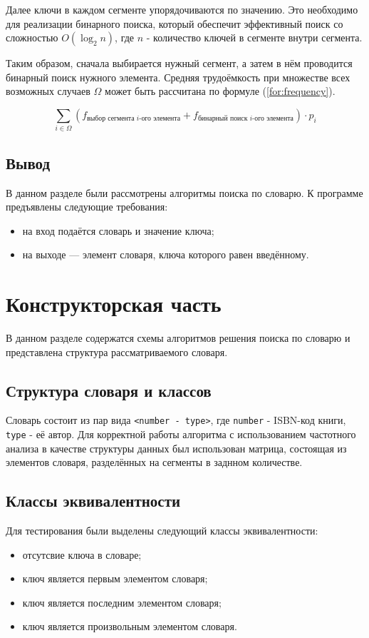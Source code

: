 \documentclass[12pt]{report}
\begin{document}
Далее ключи в каждом сегменте упорядочиваются по значению. Это необходимо для реализации бинарного поиска, который обеспечит эффективный поиск со сложностью $O(\log_2n)$, где $n$ - количество ключей в сегменте внутри сегмента.

Таким образом, сначала выбирается нужный сегмент, а затем в нём проводится бинарный поиск нужного элемента. Средняя трудоёмкость при множестве всех возможных случаев $\Omega$ может быть рассчитана по формуле (\ref{for:frequency}). 

\begin{equation}
	\label{for:frequency}
	\sum_{i \in \Omega}{\left(f_{\text{выбор сегмента $i$-ого элемента}} + f_{\text{бинарный поиск $i$-ого элемента}}\right)} \cdot p_i
\end{equation}

\section{Вывод}
В данном разделе были рассмотрены алгоритмы поиска по словарю. К программе предъявлены следующие требования:
\begin{itemize}
	\item на вход подаётся словарь и значение ключа;
	\item на выходе — элемент словаря, ключа которого равен введённому. 
\end{itemize}

\chapter{Конструкторская часть}
В данном разделе содержатся схемы алгоритмов решения поиска по словарю и представлена структура рассматриваемого словаря.

\section{Структура словаря и классов}
Словарь состоит из пар вида \texttt{<number - type>}, где \texttt{number} - ISBN-код книги, \texttt{type} - её автор. Для корректной работы алгоритма с использованием частотного анализа в качестве структуры данных был использован матрица, состоящая из элементов словаря, разделённых на сегменты в заднном количестве.

\section{Классы эквивалентности}
Для тестирования были выделены следующий классы эквивалентности:
\begin{itemize}
	\item отсутсвие ключа в словаре;
	\item ключ является первым элементом словаря;
	\item ключ является последним элементом словаря;
	\item ключ является произвольным элементом словаря.
\end{itemize}
\end{document}
